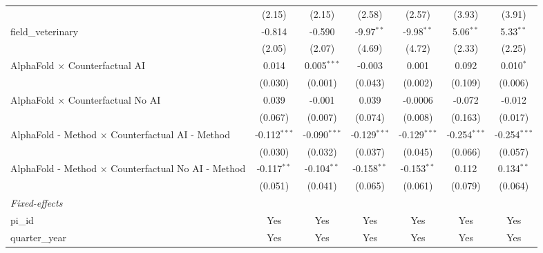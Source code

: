\begin{tabular}{lcccccc}
                                                               & (2.15)         & (2.15)         & (2.58)         & (2.57)         & (3.93)         & (3.91)\\   
   field\_veterinary                                           & -0.814         & -0.590         & -9.97$^{**}$   & -9.98$^{**}$   & 5.06$^{**}$    & 5.33$^{**}$\\   
                                                               & (2.05)         & (2.07)         & (4.69)         & (4.72)         & (2.33)         & (2.25)\\   
   AlphaFold $\times$ Counterfactual AI                        & 0.014          & 0.005$^{***}$  & -0.003         & 0.001          & 0.092          & 0.010$^{*}$\\   
                                                               & (0.030)        & (0.001)        & (0.043)        & (0.002)        & (0.109)        & (0.006)\\   
   AlphaFold $\times$ Counterfactual No AI                     & 0.039          & -0.001         & 0.039          & -0.0006        & -0.072         & -0.012\\   
                                                               & (0.067)        & (0.007)        & (0.074)        & (0.008)        & (0.163)        & (0.017)\\   
   AlphaFold - Method $\times$ Counterfactual AI - Method      & -0.112$^{***}$ & -0.090$^{***}$ & -0.129$^{***}$ & -0.129$^{***}$ & -0.254$^{***}$ & -0.254$^{***}$\\   
                                                               & (0.030)        & (0.032)        & (0.037)        & (0.045)        & (0.066)        & (0.057)\\   
   AlphaFold - Method $\times$ Counterfactual No AI - Method   & -0.117$^{**}$  & -0.104$^{**}$  & -0.158$^{**}$  & -0.153$^{**}$  & 0.112          & 0.134$^{**}$\\   
                                                               & (0.051)        & (0.041)        & (0.065)        & (0.061)        & (0.079)        & (0.064)\\   
   \midrule
   \emph{Fixed-effects}\\
   pi\_id                                                      & Yes            & Yes            & Yes            & Yes            & Yes            & Yes\\  
   quarter\_year                                               & Yes            & Yes            & Yes            & Yes            & Yes            & Yes\\  

\end{tabular}
